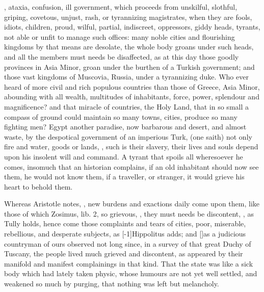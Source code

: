 {, ataxia, confusion, ill government, which
proceeds from unskilful, slothful, griping, covetous, unjust, rash, or
tyrannizing magistrates, when they are fools, idiots, children, proud,
wilful, partial, indiscreet, oppressors, giddy heads, tyrants, not able
or unfit to manage such offices: many noble cities and flourishing
kingdoms by that means are desolate, the whole body groans under such
heads, and all the members must needs be disaffected, as at this day
those goodly provinces in Asia Minor, \etc{} groan under the burthen of a
Turkish government; and those vast kingdoms of Muscovia, Russia,
under a tyrannizing duke. Who ever heard of more civil and rich
populous countries than those of Greece, Asia Minor, abounding with all
wealth, multitudes of inhabitants, force, power, splendour and
magnificence? and that miracle of countries, the Holy Land, that
in so small a compass of ground could maintain so many towns, cities,
produce so many fighting men? Egypt another paradise, now barbarous and
desert, and almost waste, by the despotical government of an imperious
Turk,  (one saith) not only
fire and water, goods or lands, , such is their slavery, their lives and souls
depend upon his insolent will and command. A tyrant that spoils all
wheresoever he comes, insomuch that an historian complains, if an
old inhabitant should now see them, he would not know them, if a
traveller, or stranger, it would grieve his heart to behold them.

Whereas Aristotle notes, ,
new burdens and exactions daily come upon them, like those of which
Zosimus, lib. 2, so grievous, , they must needs be
discontent, , as  Tully holds,
hence come those complaints and tears of cities, poor, miserable,
rebellious, and desperate subjects, as [-1\baselineskip]Hippolitus adds; and
[\baselineskip]as a judicious countryman of ours observed not long since, in a
survey of that great Duchy of Tuscany, the people lived much grieved
and discontent, as appeared by their manifold and manifest complainings
in that kind. That the state was like a sick body which had lately
taken physic, whose humours are not yet well settled, and weakened so
much by purging, that nothing was left but melancholy.

}
